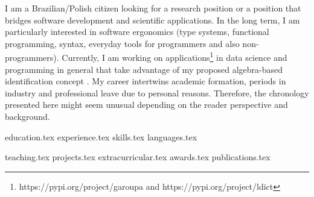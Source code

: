 \documentclass[letterpaper,11pt]{article}
\begin{document}
\newpage


\vspace{0.35cm}
{\justifying
I am a Brazilian/Polish citizen looking for a research position or a position that bridges software development and scientific applications. 
In the long term, I am particularly interested in software ergonomics (type systems, functional programming, syntax, everyday tools for programmers and also non-programmers).
Currently, I am working on applications\footnote{https://pypi.org/project/garoupa and https://pypi.org/project/ldict} in data science and programming in general that take advantage of my proposed algebra-based identification concept \cite{pereirasantos2021predictable}. 
My career intertwins academic formation, periods in industry and professional leave due to personal reasons.
Therefore, the chronology presented here might seem unusual depending on the reader perspective and background.

}

{education.tex}
{experience.tex}
\pagebreak
\sidebyside
    {{skills.tex}}
    {{languages.tex}}


{teaching.tex}
{projects.tex}
{extracurricular.tex}
{awards.tex}
{publications.tex}
\end{document}
